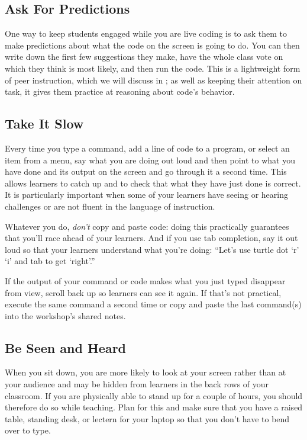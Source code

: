 \subsection*{Ask For Predictions}

One way to keep students engaged while you are live coding
is to ask them to make predictions about what the code on the screen is going to do.
You can then write down the first few suggestions they make,
have the whole class vote on which they think is most likely,
and then run the code.
This is a lightweight form of peer instruction,
which we will discuss in ;
as well as keeping their attention on task,
it gives them practice at reasoning about code's behavior.

\subsection*{Take It Slow}

Every time you type a command,
add a line of code to a program,
or select an item from a menu,
say what you are doing out loud
and then point to what you have done and its output on the screen
and go through it a second time.
This allows learners to catch up
and to check that what they have just done is correct.
It is particularly important when some of your learners have seeing or hearing challenges
or are not fluent in the language of instruction.

Whatever you do,
\emph{don't} copy and paste code:
doing this practically guarantees that you'll race ahead of your learners.
And if you use tab completion,
say it out loud so that your learners understand what you're doing:
``Let's use turtle dot `r' `i' and tab to get `right'.''

If the output of your command or code makes what you just typed disappear from view,
scroll back up so learners can see it again.
If that's not practical,
execute the same command a second time
or copy and paste the last command(s) into the workshop's shared notes.

\subsection*{Be Seen and Heard}

When you sit down,
you are more likely to look at your screen rather than at your audience
and may be hidden from learners in the back rows of your classroom.
If you are physically able to stand up for a couple of hours,
you should therefore do so while teaching.
Plan for this and make sure that you have a raised table,
standing desk,
or lectern
for your laptop
so that you don't have to bend over to type.

